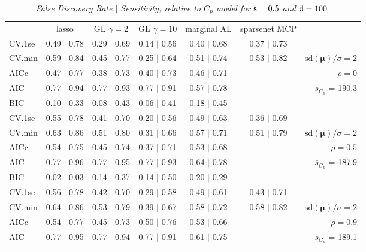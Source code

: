 \documentclass[12pt]{article}
\newcommand{\mr}[1]{\mathrm{#1}}
\newcommand{\bm}[1]{\mathbf{#1}}
\begin{document}
\begin{table}[p]\vspace{-.5cm}
\caption[l]{\label{sens}\it False Discovery Rate $\mid$ Sensitivity, relative to $C_p$ model  for ${\sf s}=0.5$ and ${\sf d}=100$.}
\vspace{-.5cm}
\small{}
\begin{center}
\begin{tabular}{l*{5}{c}|r}
 & lasso & GL $\gamma=2$ & GL $\gamma=10$ & marginal AL & sparsenet MCP  & \\
 \cline{1-7}
CV.1se & 0.49 $\mid$ 0.78 & 0.29 $\mid$ 0.69 & 0.14 $\mid$ 0.56 & 0.40 $\mid$ 0.68 & 0.37 $\mid$ 0.73 &\\
CV.min & 0.59 $\mid$ 0.84 & 0.45 $\mid$ 0.77 & 0.25 $\mid$ 0.64 & 0.51 $\mid$ 0.74 & 0.53 $\mid$ 0.82 &  $\mr{sd}(\bm{\mu})/\sigma=2$ \\
AICc & 0.47 $\mid$ 0.77 & 0.38 $\mid$ 0.73 & 0.40 $\mid$ 0.73 & 0.46 $\mid$ 0.71 & & $\rho=0$ \\
AIC & 0.77 $\mid$ 0.94 & 0.77 $\mid$ 0.93 & 0.77 $\mid$ 0.91 & 0.57 $\mid$ 0.78 & & \multirow{2}{*}{$\bar{s}_{C_p}$ = 190.3} \\
BIC & 0.10 $\mid$ 0.33 & 0.08 $\mid$ 0.43 & 0.06 $\mid$ 0.41 & 0.18 $\mid$ 0.45 & & \\
 \hline 
CV.1se & 0.55 $\mid$ 0.78 & 0.41 $\mid$ 0.70 & 0.20 $\mid$ 0.56 & 0.49 $\mid$ 0.63 & 0.36 $\mid$ 0.69 &\\
CV.min & 0.63 $\mid$ 0.86 & 0.51 $\mid$ 0.80 & 0.31 $\mid$ 0.66 & 0.57 $\mid$ 0.71 & 0.51 $\mid$ 0.79 &  $\mr{sd}(\bm{\mu})/\sigma=2$ \\
AICc & 0.54 $\mid$ 0.75 & 0.45 $\mid$ 0.74 & 0.37 $\mid$ 0.71 & 0.53 $\mid$ 0.68 & & $\rho=0.5$ \\
AIC & 0.77 $\mid$ 0.96 & 0.77 $\mid$ 0.95 & 0.77 $\mid$ 0.93 & 0.64 $\mid$ 0.78 & & \multirow{2}{*}{$\bar{s}_{C_p}$ = 187.9} \\
BIC & 0.02 $\mid$ 0.03 & 0.14 $\mid$ 0.37 & 0.14 $\mid$ 0.50 & 0.20 $\mid$ 0.29 & & \\
 \hline 
CV.1se & 0.56 $\mid$ 0.78 & 0.42 $\mid$ 0.70 & 0.29 $\mid$ 0.58 & 0.49 $\mid$ 0.61 & 0.43 $\mid$ 0.71 &\\
CV.min & 0.64 $\mid$ 0.86 & 0.53 $\mid$ 0.79 & 0.39 $\mid$ 0.67 & 0.58 $\mid$ 0.72 & 0.58 $\mid$ 0.82 &  $\mr{sd}(\bm{\mu})/\sigma=2$ \\
AICc & 0.54 $\mid$ 0.77 & 0.45 $\mid$ 0.73 & 0.50 $\mid$ 0.76 & 0.53 $\mid$ 0.66 & & $\rho=0.9$ \\
AIC & 0.77 $\mid$ 0.95 & 0.77 $\mid$ 0.94 & 0.77 $\mid$ 0.91 & 0.61 $\mid$ 0.75 & & \multirow{2}{*}{$\bar{s}_{C_p}$ = 189.1} \\

\end{tabular}
\end{center}
\end{table}
\end{document}
